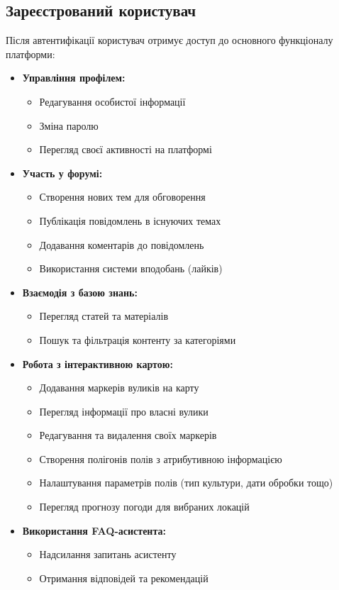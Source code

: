 \subsection{Зареєстрований користувач}
Після автентифікації користувач отримує доступ до основного функціоналу платформи:
\begin{itemize}
    \item \textbf{Управління профілем:}
    \begin{itemize}
        \item Редагування особистої інформації
        \item Зміна паролю
        \item Перегляд своєї активності на платформі
    \end{itemize}
    
    \item \textbf{Участь у форумі:}
    \begin{itemize}
        \item Створення нових тем для обговорення
        \item Публікація повідомлень в існуючих темах
        \item Додавання коментарів до повідомлень
        \item Використання системи вподобань (лайків)
    \end{itemize}
    
    \item \textbf{Взаємодія з базою знань:}
    \begin{itemize}
        \item Перегляд статей та матеріалів
        \item Пошук та фільтрація контенту за категоріями
    \end{itemize}
    
    \item \textbf{Робота з інтерактивною картою:}
    \begin{itemize}
        \item Додавання маркерів вуликів на карту
        \item Перегляд інформації про власні вулики
        \item Редагування та видалення своїх маркерів
        \item Створення полігонів полів з атрибутивною інформацією
        \item Налаштування параметрів полів (тип культури, дати обробки тощо)
        \item Перегляд прогнозу погоди для вибраних локацій
    \end{itemize}
    
    \item \textbf{Використання FAQ-асистента:}
    \begin{itemize}
        \item Надсилання запитань асистенту
        \item Отримання відповідей та рекомендацій
    \end{itemize}
\end{itemize}

